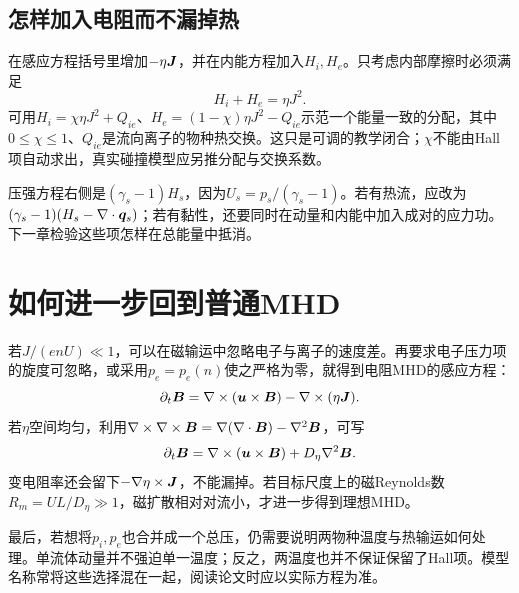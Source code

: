 \subsection{怎样加入电阻而不漏掉热}
在感应方程括号里增加$-\eta\bm{J}$，并在内能方程加入$H_i,H_e$。只考虑内部摩擦时必须满足
\begin{equation}H_i+H_e=\eta J^2.\end{equation}
可用$H_i=\chi\eta J^2+Q_{ie}$、$H_e=(1-\chi)\eta J^2-Q_{ie}$示范一个能量一致的分配，其中$0\leq\chi\leq1$、$Q_{ie}$是流向离子的物种热交换。这只是可调的教学闭合；$\chi$不能由Hall项自动求出，真实碰撞模型应另推分配与交换系数。

压强方程右侧是$(\gamma_s-1)H_s$，因为$U_s=p_s/(\gamma_s-1)$。若有热流，应改为$(\gamma_s-1)(H_s-\nabla\cdot\bm{q}_s)$；若有黏性，还要同时在动量和内能中加入成对的应力功。下一章检验这些项怎样在总能量中抵消。

\section{如何进一步回到普通MHD}
若$J/(enU)\ll1$，可以在磁输运中忽略电子与离子的速度差。再要求电子压力项的旋度可忽略，或采用$p_e=p_e(n)$使之严格为零，就得到电阻MHD的感应方程：
\begin{equation}
\partial_t\bm{B}=\nabla\times(\bm{u}\times\bm{B})-\nabla\times(\eta\bm{J}).
\end{equation}
若$\eta$空间均匀，利用$\nabla\times\nabla\times\bm{B}=\nabla(\nabla\cdot\bm{B})-\nabla^2\bm{B}$，可写
\begin{equation}
\partial_t\bm{B}=\nabla\times(\bm{u}\times\bm{B})+D_\eta\nabla^2\bm{B}.
\end{equation}
变电阻率还会留下$-\nabla\eta\times\bm{J}$，不能漏掉。若目标尺度上的磁Reynolds数$R_m=UL/D_\eta\gg1$，磁扩散相对对流小，才进一步得到理想MHD。

最后，若想将$p_i,p_e$也合并成一个总压，仍需要说明两物种温度与热输运如何处理。单流体动量并不强迫单一温度；反之，两温度也并不保证保留了Hall项。模型名称常将这些选择混在一起，阅读论文时应以实际方程为准。

